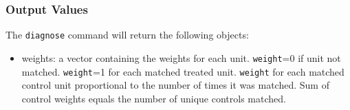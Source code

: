 \documentclass[oneside,letterpaper,titlepage]{article}
\begin{document}
\begin{appendix}
\subsubsection{Output Values}
The \texttt{diagnose} command will return the following objects: 
\begin{itemize}
\item{weights}: a vector containing the weights for each unit.  {\tt weight}=0 if unit not matched.  {\tt weight}=1 for each matched treated unit.
{\tt weight} for each matched control unit proportional to the number of times it was matched.  Sum of control weights equals the number of unique controls
matched.  
\end{itemize}

\end{appendix}





\printindex
\end{document}
